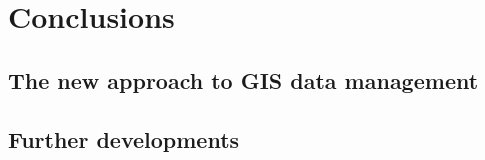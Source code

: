 \chapter{Conclusions}

    \begin{chaptersum}
        \blindtext[2]
    \end{chaptersum}

    \section{The new approach to GIS data management}
    \section{Further developments}

